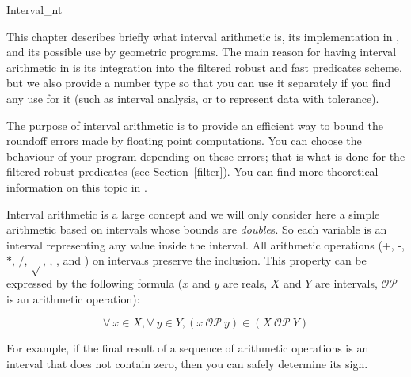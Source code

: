 
\begin{ccClass} {Interval_nt}
\label{interval}

This chapter describes briefly what interval arithmetic is, its implementation
in {\cgal}, and its possible use by geometric programs.
The main reason for having interval arithmetic in {\cgal} is its integration
into the filtered robust and fast predicates scheme, but we also provide a
number type so that you can use it separately if you find any use for it
(such as interval analysis, or to represent data with tolerance).


The purpose of interval arithmetic is to provide an efficient way to bound
the roundoff errors made by floating point computations.
You can choose the behaviour of your program depending on these errors; that
is what is done for the filtered robust predicates (see Section~\ref{filter}).
You can find more theoretical information on this topic in
\cite{bbp-iayea-98}.

\ccDefinition
Interval arithmetic is a large concept and we will only consider here a 
simple arithmetic based on intervals whose bounds are {\it double}s.
So each variable is an interval representing any value inside the interval.
All arithmetic operations (+, -, $*$, $/$, $\sqrt{}$, ,
,  and ) on intervals preserve the inclusion.
This property can be expressed by the following formula ($x$ and $y$ are
reals, $X$ and $Y$ are intervals, $\mathcal{OP}$ is an arithmetic operation):

$$
\forall\ x \in X, \forall\ y \in Y, (x\ \mathcal{OP}\ y)
\in (X\ \mathcal{OP}\ Y)
$$

For example, if the final result of a sequence of arithmetic operations is
an interval that does not contain zero, then you can safely determine its sign.


\ccCreation


\end{ccClass}
